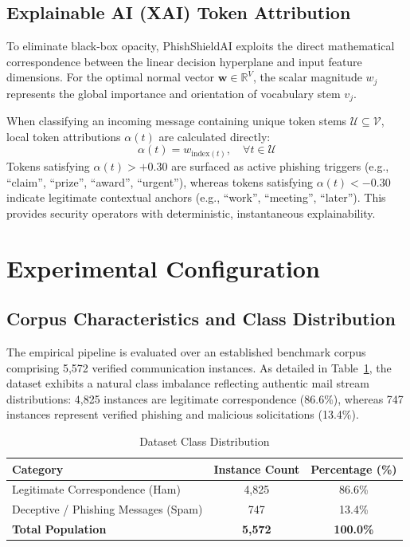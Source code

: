 \documentclass[conference]{IEEEtran}
\begin{document}
\subsection{Explainable AI (XAI) Token Attribution}
To eliminate black-box opacity, PhishShieldAI exploits the direct mathematical correspondence between the linear decision hyperplane and input feature dimensions. For the optimal normal vector $\mathbf{w} \in \mathbb{R}^V$, the scalar magnitude $w_j$ represents the global importance and orientation of vocabulary stem $v_j$. 

When classifying an incoming message containing unique token stems $\mathcal{U} \subseteq \mathcal{V}$, local token attributions $\alpha(t)$ are calculated directly:
\begin{equation}
    \alpha(t) = w_{\text{index}(t)}, \quad \forall t \in \mathcal{U}
\end{equation}
Tokens satisfying $\alpha(t) > +0.30$ are surfaced as active phishing triggers (e.g., ``claim'', ``prize'', ``award'', ``urgent''), whereas tokens satisfying $\alpha(t) < -0.30$ indicate legitimate contextual anchors (e.g., ``work'', ``meeting'', ``later''). This provides security operators with deterministic, instantaneous explainability.

\section{Experimental Configuration}

\subsection{Corpus Characteristics and Class Distribution}
The empirical pipeline is evaluated over an established benchmark corpus comprising 5,572 verified communication instances. As detailed in Table~\ref{tab:distribution}, the dataset exhibits a natural class imbalance reflecting authentic mail stream distributions: 4,825 instances are legitimate correspondence (86.6\%), whereas 747 instances represent verified phishing and malicious solicitations (13.4\%).

\begin{table}[htbp]
\caption{Dataset Class Distribution}
\begin{center}
\begin{tabular}{lcc}
\toprule
\textbf{Category} & \textbf{Instance Count} & \textbf{Percentage (\%)} \\
\midrule
Legitimate Correspondence (Ham) & 4,825 & 86.6\% \\
Deceptive / Phishing Messages (Spam) & 747 & 13.4\% \\
\midrule
\textbf{Total Population} & \textbf{5,572} & \textbf{100.0\%} \\
\bottomrule
\end{tabular}
\label{tab:distribution}
\end{center}
\end{table}
\end{document}

